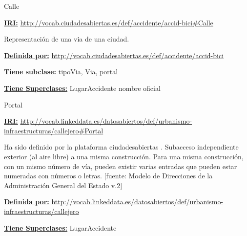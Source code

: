 \begin{mybox}{Calle}
\begin{flushleft}
\underline{\textbf{IRI:}}
\url{http://vocab.ciudadesabiertas.es/def/accidente/accid-bici#Calle}
\newline

Representación de una via de una ciudad.
\newline

\underline{\textbf{Definida por:}}
\url{http://vocab.ciudadesabiertas.es/def/accidente/accid-bici}
\newline

\underline{\textbf{Tiene subclase:}}
\newline tipoVia,\hspace{2em} Via,\hspace{2em} portal
\newline 

\underline{\textbf{Tiene Superclases:}}
\newline LugarAccidente \hspace{2em} nombre oficial

\end{flushleft}
\end{mybox}




\begin{mybox}{Portal}
\begin{flushleft}
\underline{\textbf{IRI:}}
\url{http://vocab.linkeddata.es/datosabiertos/def/urbanismo-infraestructuras/callejero#Portal}
\newline

Ha sido definido por la plataforma ciudadesabiertas \cite{datosabiertos_portal}.
Subacceso independiente exterior (al aire libre) a una misma construcción. Para una misma construcción, con un mismo número de vía, pueden existir varias entradas que pueden estar numeradas con números o letras. [fuente: Modelo de Direcciones de la Administración General del Estado v.2]
\newline

\underline{\textbf{Definida por:}}
\url{http://vocab.linkeddata.es/datosabiertos/def/urbanismo-infraestructuras/callejero}
\newline

\underline{\textbf{Tiene Superclases:}}
	LugarAccidente
\newline

\end{flushleft}
\end{mybox}


